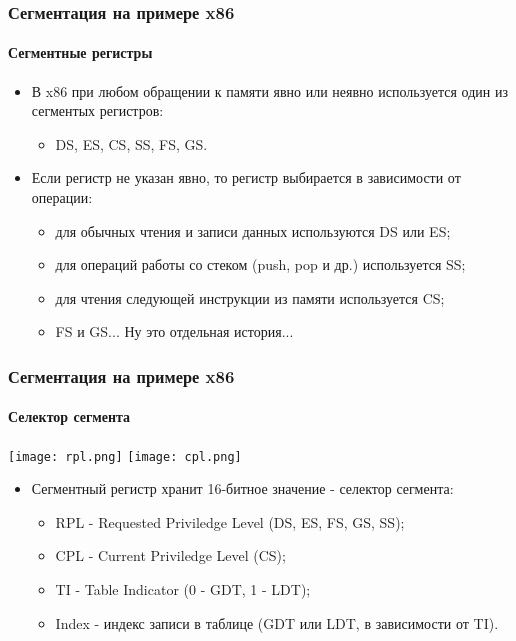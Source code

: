 \begin{frame}
\frametitle{Сегментация на примере x86}
\framesubtitle{Сегментные регистры}
\begin{itemize}
  \item В x86 при любом обращении к памяти явно или неявно используется один из
  сегментых регистров:
  \begin{itemize}
    \item DS, ES, CS, SS, FS, GS.
  \end{itemize}
  \item Если регистр не указан явно, то регистр выбирается в зависимости от
  операции:
  \begin{itemize}
    \item для обычных чтения и записи данных используются DS или ES;
    \item для операций работы со стеком (push, pop и др.) используется SS;
    \item для чтения следующей инструкции из памяти используется CS;
    \item FS и GS... Ну это отдельная история...
  \end{itemize}
\end{itemize}
\end{frame}

\begin{frame}
\frametitle{Сегментация на примере x86}
\framesubtitle{Селектор сегмента}
\begin{center}
  \texttt{[image: rpl.png]}
  \texttt{[image: cpl.png]}
\end{center}
\begin{itemize}
  \item Сегментный регистр хранит 16-битное значение - селектор сегмента:
  \begin{itemize}
    \item RPL - Requested Priviledge Level (DS, ES, FS, GS, SS);
    \item CPL - Current Priviledge Level (CS);
    \item TI - Table Indicator (0 - GDT, 1 - LDT);
    \item Index - индекс записи в таблице (GDT или LDT, в зависимости от TI).
  \end{itemize}
\end{itemize}
\end{frame}

